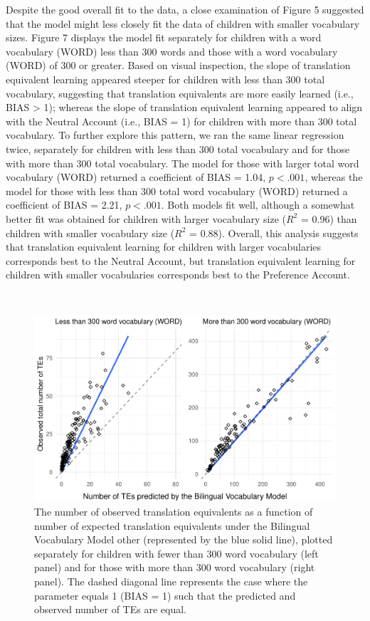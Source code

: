 \documentclass[
  english,
  ,man,floatsintext]{apa6}
\begin{document}
Despite the good overall fit to the data, a close examination of Figure 5 suggested that the model might less closely fit the data of children with smaller vocabulary sizes. Figure 7 displays the model fit separately for children with a word vocabulary (WORD) less than 300 words and those with a word vocabulary (WORD) of 300 or greater. Based on visual inspection, the slope of translation equivalent learning appeared steeper for children with less than 300 total vocabulary, suggesting that translation equivalents are more easily learned (i.e., BIAS \textgreater{} 1); whereas the slope of translation equivalent learning appeared to align with the Neutral Account (i.e., BIAS = 1) for children with more than 300 total vocabulary. To further explore this pattern, we ran the same linear regression twice, separately for children with less than 300 total vocabulary and for those with more than 300 total vocabulary. The model for those with larger total word vocabulary (WORD) returned a coefficient of BIAS = 1.04, \(p < .001\), whereas the model for those with less than 300 total word vocabulary (WORD) returned a coefficient of BIAS = 2.21, \(p < .001\). Both models fit well, although a somewhat better fit was obtained for children with larger vocabulary size (\(R^2\) = 0.96) than children with smaller vocabulary size (\(R^2\) = 0.88). Overall, this analysis suggests that translation equivalent learning for children with larger vocabularies corresponds best to the Neutral Account, but translation equivalent learning for children with smaller vocabularies corresponds best to the Preference Account.

~

\begin{figure}

{\centering \includegraphics[width=1.2\linewidth]{paper_TE_bilingual_vocabulary_model_files/figure-latex/fig6-1} 

}

\caption{The number of observed translation equivalents as a function of number of expected translation equivalents under the Bilingual Vocabulary Model other (represented by the blue solid line), plotted separately for children with fewer than 300 word vocabulary (left panel) and for those with more than 300 word vocabulary (right panel). The dashed diagonal line represents the case where the parameter equals 1 (BIAS = 1) such that the predicted and observed number of TEs are equal.}\label{fig:fig6}
\end{figure}
\end{document}
